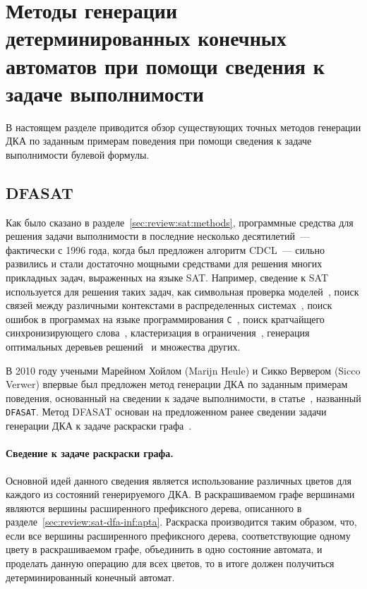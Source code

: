 


\section{Методы генерации детерминированных конечных автоматов при помощи сведения к задаче выполнимости} 
\label{sec:review:sat-dfa-inf} 

В настоящем разделе приводится обзор существующих точных методов генерации ДКА по заданным примерам поведения при помощи сведения к задаче выполнимости булевой формулы.

\subsection{DFASAT}
\label{sec:review:sat-dfa-inf:dfasat}

Как было сказано в разделе~\ref{sec:review:sat:methods}, программные средства для решения задачи выполнимости в последние несколько десятилетий~--- фактически с 1996 года, когда был предложен алгоритм CDCL~--- сильно развились и стали достаточно мощными средствами для решения многих прикладных задач, выраженных на языке SAT.
Например, сведение к SAT используется для решения таких задач, как символьная проверка моделей~\cite{DBLP:conf/tacas/BiereCCZ99}, поиск связей между различными контекстами в распределенных системах~\cite{DBLP:conf/context/BouquetMSZ03}, поиск ошибок в программах на языке программирования \texttt{C}~\cite{DBLP:conf/cav/XieA05}, поиск кратчайщего синхронизирующего слова~\cite{DBLP:conf/wia/SkvortsovT11}, кластеризация в ограничения~\cite{DBLP:conf/ida/MetivierBCKL12}, генерация оптимальных деревьев решений~\cite{DBLP:conf/ijcai/NarodytskaIPM18} и множества других.

В 2010 году учеными Марейном Хойлом (Marijn Heule) и Сикко Вервером (Sicco Verwer) впервые был предложен метод генерации ДКА по заданным примерам поведения, основанный на сведении к задаче выполнимости, в статье~\cite{heule-icgi10}, названный \texttt{DFASAT}.
Метод DFASAT основан на предложенном ранее сведении задачи генерации ДКА к задаче раскраски графа~\cite{Coste97regularinference}.

\paragraph*{Сведение к задаче раскраски графа.}
Основной идей данного сведения является использование различных цветов для каждого из состояний генерируемого ДКА.
В раскрашиваемом графе вершинами являются вершины расширенного префиксного дерева, описанного в разделе~\ref{sec:review:sat-dfa-inf:apta}.
Раскраска производится таким образом, что, если все вершины расширенного префиксного дерева, соответствующие одному цвету в раскрашиваемом графе, объединить в одно состояние автомата, и проделать данную операцию для всех цветов, то в итоге должен получиться детерминированный конечный автомат. 

